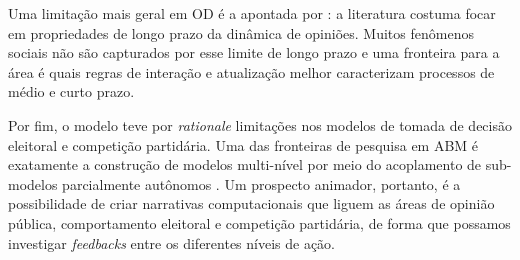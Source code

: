 Uma limitação mais geral em OD é a apontada por
: a literatura costuma focar em propriedades de
longo prazo da dinâmica de opiniões. Muitos fenômenos sociais não são capturados
por esse limite de longo prazo e uma fronteira para a área é quais regras de
interação e atualização melhor caracterizam processos de médio e curto prazo.

Por fim, o modelo teve por \textit{rationale} limitações nos modelos de tomada
de decisão eleitoral e competição partidária. Uma das fronteiras de pesquisa em
ABM é exatamente a construção de modelos multi-nível por meio do acoplamento de
sub-modelos parcialmente autônomos \cite{hjorth2016turtles,head2015evolving}. Um
prospecto animador, portanto, é a possibilidade de criar narrativas
computacionais que liguem as áreas de opinião pública, comportamento eleitoral e
competição partidária, de forma que possamos investigar \textit{feedbacks} entre
os diferentes níveis de ação.



